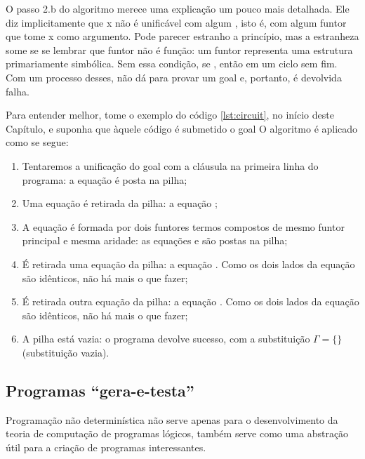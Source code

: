 \documentclass{article}
\begin{document}
O passo 2.b do algoritmo merece uma explicação um pouco mais detalhada. Ele diz implicitamente que x não é unificável com algum , isto é, com algum funtor que tome x como argumento. Pode parecer estranho a princípio, mas a estranheza some se se lembrar que funtor não é função: um funtor representa uma estrutura primariamente simbólica. Sem essa condição, se , então  em um ciclo sem fim. Com um processo desses, não dá para provar um goal e, portanto, é devolvida falha.

Para entender melhor, tome o exemplo do código \ref{lst:circuit}, no início deste Capítulo, e suponha que àquele código é submetido o goal  O algoritmo é aplicado como se segue:

  \begin{enumerate}
    \item Tentaremos a unificação do goal com a cláusula na primeira linha do programa: a equação  é posta na pilha;
    \item Uma equação é retirada da pilha: a equação ;
    \item A equação é formada por dois funtores termos compostos de mesmo funtor principal e mesma aridade: as equações  e  são postas na pilha;
    \item É retirada uma equação da pilha: a equação . Como os dois lados da equação são idênticos, não há mais o que fazer;
    \item É retirada outra equação da pilha: a equação . Como os dois lados da equação são idênticos, não há mais o que fazer;
    \item A pilha está vazia: o programa devolve sucesso, com a substituição $\Gamma = \{\}$ (substituição vazia).
  \end{enumerate}


  \subsection{Programas ``gera-e-testa''}

  Programação não determinística não serve apenas para o desenvolvimento da teoria de computação de programas lógicos, também serve como uma abstração útil para a criação de programas interessantes.
\end{document}
